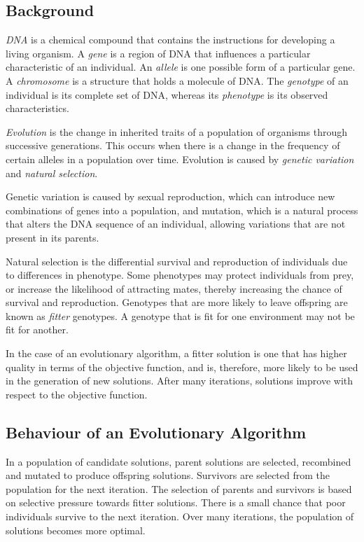 \subsection{Background}

\emph{DNA} is a chemical compound that contains the instructions for developing a living organism.
A \emph{gene} is a region of DNA that influences a particular characteristic of an individual.
An \emph{allele} is one possible form of a particular gene.
A \emph{chromosome} is a structure that holds a molecule of DNA\@.
The \emph{genotype} of an individual is its complete set of DNA, whereas its \emph{phenotype} is its observed characteristics.

\emph{Evolution} is the change in inherited traits of a population of organisms through successive generations.
This occurs when there is a change in the frequency of certain alleles in a population over time.
Evolution is caused by \emph{genetic variation} and \emph{natural selection}.

Genetic variation is caused by sexual reproduction, which can introduce new combinations of genes into a population, and mutation, which is a natural process that alters the DNA sequence of an individual, allowing variations that are not present in its parents.

Natural selection is the differential survival and reproduction of individuals due to differences in phenotype.
Some phenotypes may protect individuals from prey, or increase the likelihood of attracting mates, thereby increasing the chance of survival and reproduction.
Genotypes that are more likely to leave offspring are known as \emph{fitter} genotypes.
A genotype that is fit for one environment may not be fit for another.

In the case of an evolutionary algorithm, a fitter solution is one that has higher quality in terms of the objective function, and is, therefore, more likely to be used in the generation of new solutions.
After many iterations, solutions improve with respect to the objective function.

\subsection{Behaviour of an Evolutionary Algorithm}

In a population of candidate solutions, parent solutions are selected, recombined and mutated to produce offspring solutions.
Survivors are selected from the population for the next iteration.
The selection of parents and survivors is based on selective pressure towards fitter solutions.
There is a small chance that poor individuals survive to the next iteration.
Over many iterations, the population of solutions becomes more optimal.

